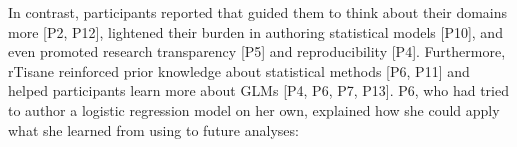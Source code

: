 In contrast, participants reported that \rTisane guided them to think about
their domains more [P2, P12], lightened their burden in authoring statistical
models [P10], and even promoted research transparency [P5] and reproducibility
[P4]. Furthermore, rTisane reinforced prior knowledge about statistical methods
[P6, P11] and helped participants learn more about GLMs [P4, P6, P7, P13]. P6,
who had tried to author a logistic regression model on her own, explained how
she could apply what she learned from using \rTisane to future analyses: 

\begin{comment}
Nevertheless, participants expected \rTisane to do more automatically.
Participants were expected rTisane’s output statistical model to include more
IVs [P2, P5], have interaction terms [P5, P6], and have coefficient values that
were similar to ones from their own statistical models without rTisane [P10].
Yet, when asked if anything surprised them about rTisane’s output statistical
model, six participants said the models were as they expected [P4, 6, 10, 11,
12, 13]. 
\end{comment}




